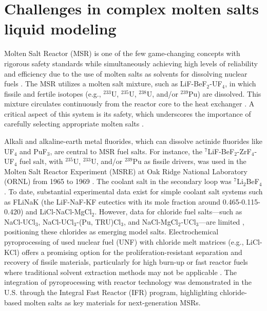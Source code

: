 \section{Challenges in complex molten salts liquid modeling } \label{intro:sec:moltensalts}
Molten Salt Reactor (MSR) is one of the few game-changing concepts with rigorous safety standards while simultaneously achieving high levels of reliability and efficiency due to the use of molten salts as solvents for dissolving nuclear fuels \cite{blander1964molten, abram2008generation, cottrell1955operation}. The MSR utilizes a molten salt mixture, such as LiF-BeF$_2$-UF$_4$, in which fissile and fertile isotopes (e.g., $^{233}$U, $^{235}$U, $^{238}$U, and/or $^{239}$Pu) are dissolved. This mixture circulates continuously from the reactor core to the heat exchanger \cite{blander1964molten, leblanc2010molten}. A critical aspect of this system is its safety, which underscores the importance of carefully selecting appropriate molten salts \cite{benevs2013thermodynamic}.

Alkali and alkaline-earth metal fluorides, which can dissolve actinide fluorides like UF$_4$ and PuF$_3$, are central to MSR fuel salts. For instance, the $^7$LiF-BeF$_2$-ZrF$_4$-UF$_4$ fuel salt, with $^{235}$U, $^{233}$U, and/or $^{239}$Pu as fissile drivers, was used in the Molten Salt Reactor Experiment (MSRE) at Oak Ridge National Laboratory (ORNL) from 1965 to 1969 \cite{blander1964molten}. The coolant salt in the secondary loop was $^7$Li$_2$BeF$_4$. To date, substantial experimental data exist for simple coolant salt systems such as FLiNaK (the LiF-NaF-KF eutectics with its mole fraction around 0.465-0.115-0.420) and LiCl-NaCl-MgCl$_2$. However, data for chloride fuel salts—such as NaCl-UCl$_3$, NaCl-UCl$_3$-(Pu, TRU)Cl$_3$, and NaCl-MgCl$_2$-UCl$_3$—are limited \cite{mourogov2006potentialities}, positioning these chlorides as emerging model salts. Electrochemical pyroprocessing of used nuclear fuel (UNF) with chloride melt matrices (e.g., LiCl-KCl) offers a promising option for the proliferation-resistant separation and recovery of fissile materials, particularly for high burn-up or fast reactor fuels where traditional solvent extraction methods may not be applicable \cite{blander1964molten}. The integration of pyroprocessing with reactor technology was demonstrated in the U.S. through the Integral Fast Reactor (IFR) program, highlighting chloride-based molten salts as key materials for next-generation MSRs.

